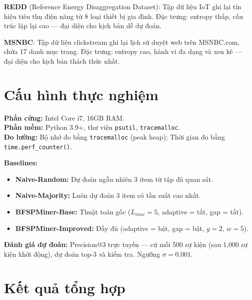 \documentclass[a4paper,12pt]{report}
\begin{document}
\textbf{REDD} (Reference Energy Disaggregation Dataset): Tập dữ liệu IoT ghi lại tín hiệu tiêu thụ điện năng từ 8 loại thiết bị gia đình. Đặc trưng: entropy thấp, cấu trúc lặp lại cao --- đại diện cho kịch bản dễ dự đoán.

\textbf{MSNBC}: Tập dữ liệu clickstream ghi lại lịch sử duyệt web trên MSNBC.com, chứa 17 danh mục trang. Đặc trưng: entropy cao, hành vi đa dạng và xen kẽ --- đại diện cho kịch bản thách thức nhất.

\section{Cấu hình thực nghiệm}

\textbf{Phần cứng:} Intel Core i7, 16GB RAM.\\
\textbf{Phần mềm:} Python 3.9+, thư viện \texttt{psutil}, \texttt{tracemalloc}.\\
\textbf{Đo lường:} Bộ nhớ đo bằng \texttt{tracemalloc} (peak heap); Thời gian đo bằng \texttt{time.perf\_counter()}.

\textbf{Baselines:}
\begin{itemize}
    \item \textbf{Naive-Random:} Dự đoán ngẫu nhiên 3 item từ tập đã quan sát.
    \item \textbf{Naive-Majority:} Luôn dự đoán 3 item có tần suất cao nhất.
    \item \textbf{BFSPMiner-Base:} Thuật toán gốc ($L_{max} = 5$, adaptive = tắt, gap = tắt).
    \item \textbf{BFSPMiner-Improved:} Đầy đủ (adaptive = bật, gap = bật, $g = 2$, $w = 5$).
\end{itemize}

\textbf{Đánh giá dự đoán:} Precision@3 trực tuyến --- cứ mỗi 500 sự kiện (sau 1,000 sự kiện khởi động), dự đoán top-3 và kiểm tra. Ngưỡng $\sigma = 0.001$.

\section{Kết quả tổng hợp}
\end{document}
